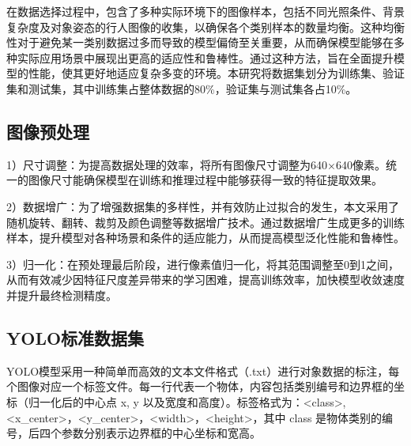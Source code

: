 \documentclass[journal]{IEEEtran}
\numberwithin{figure}{section}%
\numberwithin{table}{section}%
\numberwithin{equation}{section}
\begin{document}
在数据选择过程中，包含了多种实际环境下的图像样本，包括不同光照条件、背景复杂度及对象姿态的行人图像的收集，以确保各个类别样本的数量均衡。这种均衡性对于避免某一类别数据过多而导致的模型偏倚至关重要，从而确保模型能够在多种实际应用场景中展现出更高的适应性和鲁棒性。通过这种方法，旨在全面提升模型的性能，使其更好地适应复杂多变的环境。本研究将数据集划分为训练集、验证集和测试集，其中训练集占整体数据的80\%，验证集与测试集各占10\%。
\subsection{图像预处理}
1）尺寸调整：为提高数据处理的效率，将所有图像尺寸调整为640×640像素。统一的图像尺寸能确保模型在训练和推理过程中能够获得一致的特征提取效果。\par
2）数据增广：为了增强数据集的多样性，并有效防止过拟合的发生，本文采用了随机旋转、翻转、裁剪及颜色调整等数据增广技术。通过数据增广生成更多的训练样本，提升模型对各种场景和条件的适应能力，从而提高模型泛化性能和鲁棒性。\par
3）归一化：在预处理最后阶段，进行像素值归一化，将其范围调整至0到1之间，从而有效减少因特征尺度差异带来的学习困难，提高训练效率，加快模型收敛速度并提升最终检测精度。
\subsection{YOLO标准数据集}
YOLO模型采用一种简单而高效的文本文件格式（.txt）进行对象数据的标注，每个图像对应一个标签文件。每一行代表一个物体，内容包括类别编号和边界框的坐标（归一化后的中心点 x, y 以及宽度和高度）。标签格式为：\textless class\textgreater, \textless x\_center\textgreater，\textless y\_center\textgreater，\textless width\textgreater，\textless height\textgreater，其中 class 是物体类别的编号，后四个参数分别表示边界框的中心坐标和宽高。
\end{document}

